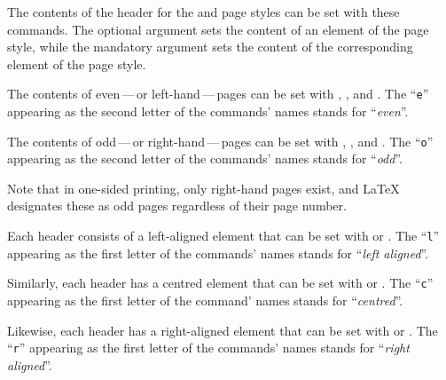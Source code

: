 \begin{Declaration}
\end{Declaration}
The contents of the header for the
 and
 page styles can be set with these
commands. The optional argument sets the content of an element of the
 page style, while the
mandatory argument sets the content of the corresponding element of the
 page style.

The contents of even\,---\,or left-hand\,---\,pages
can be set with , , and . The
``\texttt{e}'' appearing as the second letter of the commands' names stands
for ``\emph{even}''.

The contents of odd\,---\,or right-hand\,---\,pages
can be set with , , and . The
``\texttt{o}'' appearing as the second letter of the commands' names stands
for ``\emph{odd}''.

Note that in one-sided printing, only right-hand pages
exist, and \LaTeX{} designates these as odd pages regardless of their page
number.

Each header consists of a left-aligned element that can
be set with  or . The ``\texttt{l}'' appearing as
the first letter of the commands' names stands for ``\emph{left aligned}''.

Similarly, each header has a centred element that can be set
with  or . The ``\texttt{c}'' appearing as the
first letter of the command' names stands for ``\emph{centred}''.

Likewise, each header has a right-aligned element that
can be set with  or . The ``\texttt{r}'' appearing
as the first letter of the commands' names stands for ``\emph{right
aligned}''.

